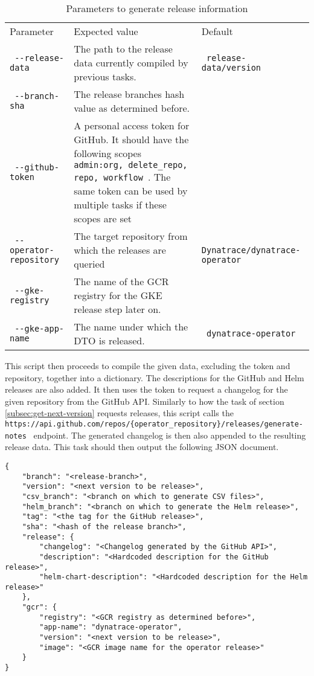 \begin{table}
    \centering
    \caption{Parameters to generate release information}
    \label{tab:params-to-generate-release-information}
    \begin{tabular}{| p | p | p |}
        Parameter & Expected value & Default \\
        \verb| --release-data | & The path to the release data currently compiled by previous tasks. & \verb| release-data/version | \\
        \verb| --branch-sha | & The release branches hash value as determined before. & \\
        \verb| --github-token | & A personal access token for GitHub. It should have the following scopes \verb| admin:org, delete_repo, repo, workflow |. The same token can be used by multiple tasks if these scopes are set & \\
        \verb| --operator-repository | & The target repository from which the releases are queried & \verb| Dynatrace/dynatrace-operator | \\
        \verb| --gke-registry | & The name of the GCR registry for the GKE release step later on. & \\
        \verb| --gke-app-name | & The name under which the DTO is released. & \verb| dynatrace-operator | \\
    \end{tabular}
\end{table}

This script then proceeds to compile the given data, excluding the token and repository, together into a dictionary.
The descriptions for the GitHub and Helm releases are also added.
It then uses the token to request a changelog for the given repository from the GitHub API.
Similarly to how the task of section \ref{subsec:get-next-version} requests releases, this script calls the \verb| https://api.github.com/repos/{operator_repository}/releases/generate-notes | endpoint.
The generated changelog is then also appended to the resulting release data.
This task should then output the following JSON document.

\begin{verbatim}
{
    "branch": "<release-branch>",
    "version": "<next version to be release>",
    "csv_branch": "<branch on which to generate CSV files>",
    "helm_branch": "<branch on which to generate the Helm release>",
    "tag": "<the tag for the GitHub release>",
    "sha": "<hash of the release branch>",
    "release": {
        "changelog": "<Changelog generated by the GitHub API>",
        "description": "<Hardcoded description for the GitHub release>",
        "helm-chart-description": "<Hardcoded description for the Helm release>"
    },
    "gcr": {
        "registry": "<GCR registry as determined before>",
        "app-name": "dynatrace-operator",
        "version": "<next version to be release>",
        "image": "<GCR image name for the operator release>"
    }
}
\end{verbatim}

